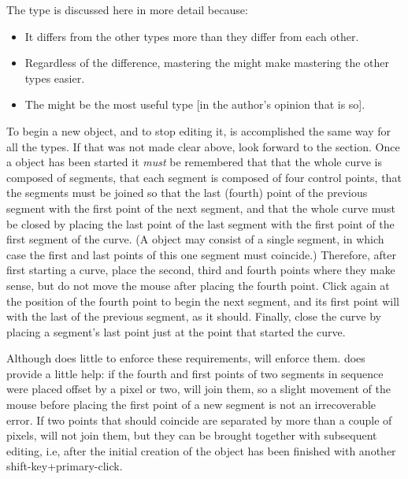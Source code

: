 			The \IXbezn{} \IXspline{} type is discussed here in more detail
			because:
			
			\begin{itemize}
				\item It differs from the other types more
						than they differ from each other.
				\item Regardless of the difference, mastering
						the \IXbezn{} might make mastering the
						other types easier.
				\item The \IXbezn{} might be the most
						useful type [in the author's opinion
						that is so].
			\end{itemize}
			
			To begin a new object, and to stop editing it,
			is accomplished the same way for all the \IXspline{} types.
			If that was not made
			clear above, look forward to the
			 section.
			Once a \IXbezn{} \IXspline{} object has been started
			it \emph{must} be remembered that that the whole
			curve is composed of segments, that each segment
			is composed of four control points, that the
			segments must be joined so that the last (fourth) point
			of the previous segment  with
			the first point of the next segment,
			and that the whole curve must be closed by
			placing the last point of the last segment
			 with the first point
			of the first segment of the curve.
			(A \IXbezn{} \IXspline{} object
			may consist of a single segment, in which case
			the first and last points of this one segment
			must coincide.) Therefore, after first starting
			a \IXbezn{} curve, place the second, third and
			fourth points where they make sense, but do not
			move the mouse after placing the fourth point.
			Click again at the position of the fourth point
			to begin the next segment, and its
			first point will  with the
			last of the previous segment, as it should.
			Finally, close the curve by placing a segment's
			last point just at the point that started the curve.
			
			Although \IXpkg{} does little to enforce these
			requirements, \IXpov{} will enforce them.
			\IXpkgu{} does provide a little help: if the
			fourth and first points of two segments in
			sequence were placed offset by a pixel or two,
			\IXpkg{} will join them, so a slight movement
			of the mouse before placing the first point
			of a new segment is not an irrecoverable error.
			If two points that should coincide are separated
			by more than a couple of pixels,
			\IXpkg{} will not join them, but they can be brought
			together with subsequent editing, i.e, after the
			initial creation of the object has been
			finished with another shift-key+primary-click.
			
